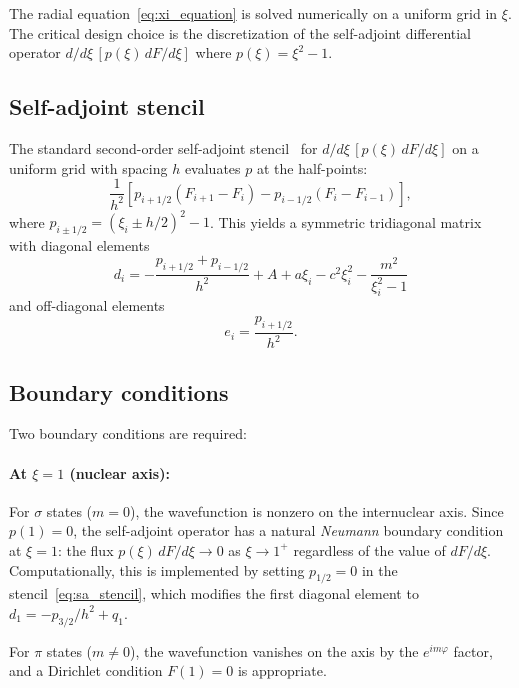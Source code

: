 \documentclass[aps,pra,twocolumn,superscriptaddress,longbibliography]{revtex4-2}
\begin{document}
The radial equation~\eqref{eq:xi_equation} is solved numerically
on a uniform grid in $\xi$.  The critical design choice is the
discretization of the self-adjoint differential operator
$d/d\xi\,[p(\xi)\,dF/d\xi]$ where $p(\xi) = \xi^2 - 1$.

\subsection{Self-adjoint stencil}

The standard second-order self-adjoint stencil~\cite{Trefethen2000}
for $d/d\xi\,[p(\xi)\,dF/d\xi]$ on a uniform grid with spacing $h$
evaluates $p$ at the half-points:
\begin{equation}
  \frac{1}{h^2}\left[
    p_{i+1/2}(F_{i+1} - F_i) - p_{i-1/2}(F_i - F_{i-1})
  \right],
  \label{eq:sa_stencil}
\end{equation}
where $p_{i\pm 1/2} = (\xi_i \pm h/2)^2 - 1$.  This yields a
symmetric tridiagonal matrix with diagonal elements
\begin{equation}
  d_i = -\frac{p_{i+1/2} + p_{i-1/2}}{h^2}
        + A + a\xi_i - c^2\xi_i^2 - \frac{m^2}{\xi_i^2 - 1}
  \label{eq:diag}
\end{equation}
and off-diagonal elements
\begin{equation}
  e_i = \frac{p_{i+1/2}}{h^2}.
  \label{eq:offdiag}
\end{equation}

\subsection{Boundary conditions}

Two boundary conditions are required:

\paragraph{At $\xi = 1$ (nuclear axis):}
For $\sigma$ states ($m = 0$), the wavefunction is nonzero on the
internuclear axis.  Since $p(1) = 0$, the self-adjoint operator has
a natural \emph{Neumann} boundary condition at $\xi = 1$: the flux
$p(\xi)\,dF/d\xi \to 0$ as $\xi \to 1^+$ regardless of the value
of $dF/d\xi$.  Computationally, this is implemented by setting
$p_{1/2} = 0$ in the stencil~\eqref{eq:sa_stencil}, which modifies
the first diagonal element to $d_1 = -p_{3/2}/h^2 + q_1$.

For $\pi$ states ($m \neq 0$), the wavefunction vanishes on the axis
by the $e^{im\varphi}$ factor, and a Dirichlet condition $F(1) = 0$
is appropriate.
\end{document}

